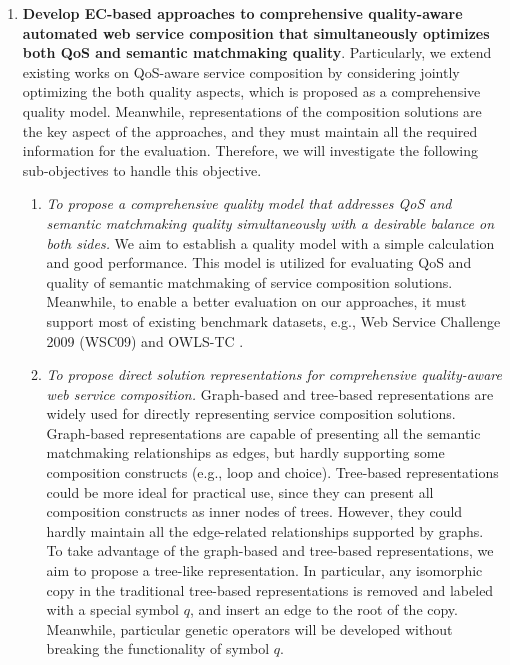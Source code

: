 \begin{enumerate}
  \item \label{Obj:1} \textbf{Develop EC-based approaches to comprehensive quality-aware automated web service composition that simultaneously optimizes both QoS and semantic matchmaking quality}. Particularly, we extend existing works on QoS-aware service composition by considering jointly optimizing the both quality aspects, which is proposed as a comprehensive quality model. Meanwhile, representations of the composition solutions are the key aspect of the approaches, and they must maintain all the required information for the evaluation. Therefore, we will investigate the following sub-objectives to handle this objective.
  \begin{enumerate}
    \item \emph{To propose a comprehensive quality model that addresses QoS and semantic matchmaking quality simultaneously with a desirable balance on both sides.} We aim to establish a quality model with a simple calculation and good performance. This model is utilized for evaluating QoS and quality of semantic matchmaking of service composition solutions. Meanwhile, to enable a better evaluation on our approaches, it must support most of existing benchmark datasets, e.g., Web Service Challenge 2009 (WSC09)\cite{kona2009wsc} and OWLS-TC \cite{kuster2008opossum}.
    
    \item \emph{To propose direct solution representations for comprehensive quality-aware web service composition.} Graph-based and tree-based representations are widely used for directly representing service composition solutions. Graph-based representations are capable of presenting all the semantic matchmaking relationships as edges, but hardly supporting some composition constructs (e.g., loop and choice). Tree-based representations could be more ideal for practical use, since they can present all composition constructs as inner nodes of trees. However, they could hardly maintain all the edge-related relationships supported by graphs. To take advantage of the graph-based and tree-based representations, we aim to propose a tree-like representation. In particular, any isomorphic copy in the traditional tree-based representations is removed and labeled with a special symbol $q$, and insert an edge to the root of the copy. Meanwhile, particular genetic operators will be developed without breaking the functionality of symbol $q$.
    

\end{enumerate}
\end{enumerate}
